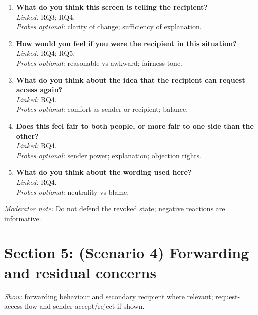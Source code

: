 \begin{enumerate}[resume]
  \item \textbf{What do you think this screen is telling the recipient?}\\
  \textit{Linked:} RQ3; RQ4.\\
  \textit{Probes optional:} clarity of change; sufficiency of explanation.

  \item \textbf{How would you feel if you were the recipient in this situation?}\\
  \textit{Linked:} RQ4; RQ5.\\
  \textit{Probes optional:} reasonable vs awkward; fairness tone.

  \item \textbf{What do you think about the idea that the recipient can request access again?}\\
  \textit{Linked:} RQ4.\\
  \textit{Probes optional:} comfort as sender or recipient; balance.

  \item \textbf{Does this feel fair to both people, or more fair to one side than the other?}\\
  \textit{Linked:} RQ4.\\
  \textit{Probes optional:} sender power; explanation; objection rights.

  \item \textbf{What do you think about the wording used here?}\\
  \textit{Linked:} RQ4.\\
  \textit{Probes optional:} neutrality vs blame.
\end{enumerate}

\textit{Moderator note:} Do not defend the revoked state; negative reactions are informative.

\section{Section 5: (Scenario 4) Forwarding and residual concerns}
\textit{Show:} forwarding behaviour and secondary recipient where relevant; request-access flow and sender accept/reject if shown.


